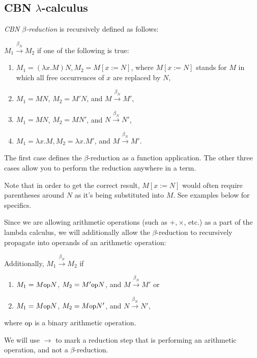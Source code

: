 \documentclass{article}
\newcommand{\lam}{\lambda}
\newcommand{\cbnb}{\overset{\beta_{N}}{\rightarrow}}
\newcommand{\op}{\mbox{\small{op}}}
\begin{document}
\subsection{CBN $\lam$-calculus}\label{cbn}
\textit{CBN $\beta$-reduction} is recursively defined as follows: 

$M_1 \cbnb M_2$ if one of the following is true:
\begin{enumerate}
\item $M_1 = (\lam x. M) N, M_2 = M [ x := N]$, where $M [ x := N]$ stands for $M$ in which all free occurrences of $x$ are replaced by $N$,
\item $M_1 = MN$, $M_2 = M'N$, and $M \cbnb M'$,
\item $M_1 = MN$, $M_2 = MN'$, and $N \cbnb N'$,
\item $M_1 = \lam x. M, M_2 = \lam x. M'$, and $M \cbnb M'$.
\end{enumerate}
The first case defines the $\beta$-reduction as a function application. The other three cases allow you to perform the reduction anywhere in a term. 

Note that in order to get the correct result, $M [ x := N]$ would often require parentheses around $N$ as it's being 
substituted into $M$. See examples below for specifics. 

Since we are allowing arithmetic operations (such as $+, \times$, etc.) as a part of the lambda calculus, we will additionally allow the $\beta$-reduction to recursively propagate into operands of an arithmetic operation:  

Additionally, $M_1 \cbnb M_2$ if 
\begin{enumerate}
\item $M_1 = M \op N$, $M_2 = M' \op N$, and $M \cbnb M'$ or
\item $M_1 = M \op N$, $M_2 = M \op N'$, and $N \cbnb N'$,
\end{enumerate}
where $\op$ is a binary arithmetic operation. 

We will use $\rightarrow$ to mark a reduction step that is performing an arithmetic operation, and not a $\beta$-reduction.
\end{document}
